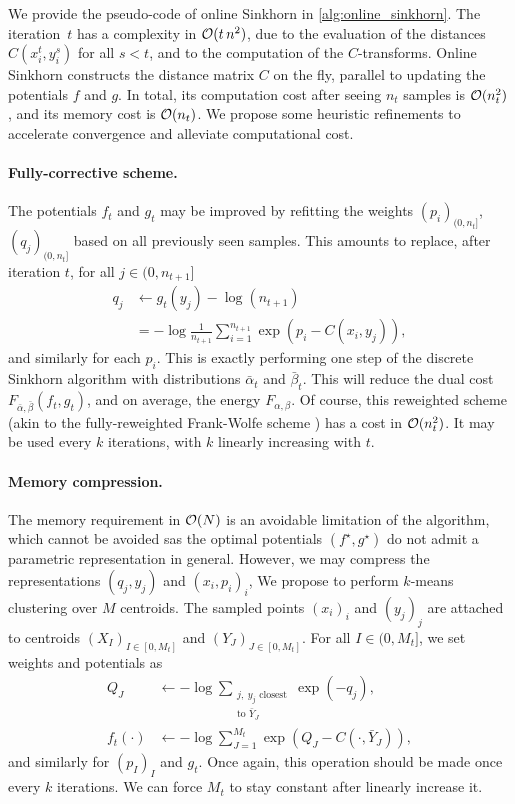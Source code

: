 We provide the pseudo-code of online Sinkhorn in \autoref{alg:online_sinkhorn}.
The iteration~$t$ has a complexity in $\mathcal{O}(t\,n^2)$, due to the evaluation of
the distances $C(x_i^t, y_i^s)$ for all $s < t$, and to the computation of the
$C$-transforms. Online Sinkhorn constructs the distance matrix $C$ on the fly,
parallel to updating the potentials $f$ and $g$. In total, its computation cost
after seeing $n_t$ samples is $\mathcal{O}(n_t^2)$, and its memory cost is $\mathcal{O}(n_t)$.
We propose some heuristic refinements to accelerate convergence and alleviate
computational cost.


\paragraph{Fully-corrective scheme.} The potentials $f_t$ and $g_t$ may be
improved by refitting the weights $(p_i)_{(0, n_t]}$, $(q_j)_{(0, n_t]}$ based
on all previously seen samples. This
amounts to replace, after iteration $t$, for all $j \in (0, n_{t+1}]$
\begin{align}
    q_j &\gets g_t(y_j) - \log(n_{t+1}) \\
    &= - \log \frac{1}{n_{t+1}} 
    \sum_{i=1}^{n_{t+1}} \exp(p_i - C(x_i, y_j)),
\end{align}
and similarly for each $p_i$. This is exactly performing one step of the
 discrete Sinkhorn algorithm with distributions $\bar \alpha_t$ and $\bar
 \beta_t$. This will reduce the dual cost $F_{ \bar \alpha, \bar \beta}(f_t,
 g_t)$, and on average, the energy $F_{\alpha, \beta}$. Of course, this
 reweighted scheme (akin to the fully-reweighted Frank-Wolfe scheme \cite{}) has
 a cost in $\mathcal{O}(n_t^2)$. It may be used every $k$ iterations, with $k$ linearly
 increasing with $t$.

\paragraph{Memory compression.} The memory requirement in $\mathcal{O}(N)$ is an
avoidable limitation of the algorithm, which cannot be avoided sas the optimal
potentials $(f^\star, g^\star)$ do not admit a parametric representation in
general. However, we may compress the representations $(q_j, y_j)$ and $(x_i,
p_i)_i$, We propose to perform $k$-means clustering over $M$ centroids. The
sampled points $(x_i)_i$ and $(y_j)_j$ are attached to centroids ${(X_I)}_{I \in
[0,M_t]}$ and ${(Y_J)}_{J \in [0,M_t]}$. For all $I \in (0, M_t]$, we set
weights and potentials as
\begin{align}
    Q_J &\gets - \log \sum_{\substack{j,\:y_j \text{ closest}\\\text{to } \bar Y_J}}
     \exp(-q_j),\\
    f_t(\cdot) &\gets - \log\sum_{J=1}^{M_t} \exp(Q_J - C(\cdot, \bar Y_J)),
\end{align}
and similarly for $(p_I)_I$ and $g_t$. Once again, this operation should be made
once every $k$ iterations. We can force $M_t$ to stay constant after linearly increase it.

